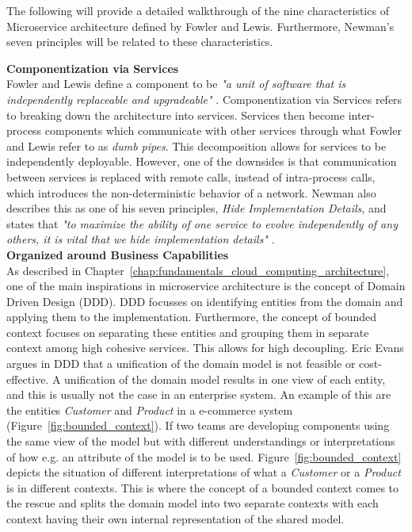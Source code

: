 \noindent The following will provide a detailed walkthrough of the nine characteristics of Microservice architecture defined by Fowler and Lewis. Furthermore, Newman's seven principles will be related to these characteristics.


\noindent\textbf{Componentization via Services}\\ 
Fowler and Lewis define a component to be \textit{"a unit of software that is independently replaceable and upgradeable"} \cite[p. 4]{lewis2014microservices}. Componentization via Services refers to breaking down the architecture into services. Services then become inter-process components which communicate with other services through what Fowler and Lewis refer to as \textit{dumb pipes}. This decomposition allows for services to be independently deployable. However, one of the downsides is that communication between services is replaced with remote calls, instead of intra-process calls, which introduces the non-deterministic behavior of a network. Newman also describes this as one of his seven principles, \textit{Hide Implementation Details}, and states that \textit{"to maximize the ability of one service to evolve independently of any others, it is vital that we hide implementation details"} \cite[p. 247]{newman2015building}. \\


\noindent\textbf{Organized around Business Capabilities} \\
As described in Chapter~\ref{chap:fundamentals_cloud_computing_architecture}, one of the main inspirations in microservice architecture is the concept of Domain Driven Design (DDD). DDD focusses on identifying entities from the domain and applying them to the implementation. Furthermore, the concept of bounded context focuses on separating these entities and grouping them in separate context among high cohesive services. This allows for high decoupling. Eric Evans argues in DDD \cite[p. 217]{evans2004domain-driven} that a unification of the domain model is not feasible or cost-effective. A unification of the domain model results in one view of each entity, and this is usually not the case in an enterprise system. An example of this are the entities \textit{Customer} and \textit{Product} in a e-commerce system (Figure~\ref{fig:bounded_context}). If two teams are developing components using the same view of the model but with different understandings or interpretations of how e.g. an attribute of the model is to be used. Figure~\ref{fig:bounded_context} depicts the situation of different interpretations of what a \textit{Customer} or a \textit{Product} is in different contexts. This is where the concept of a bounded context comes to the rescue and splits the domain model into two separate contexts with each context having their own internal representation of the shared model. 

